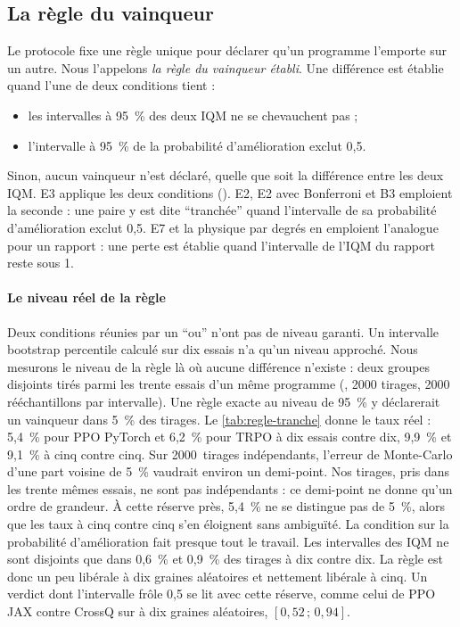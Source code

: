 \subsection{La règle du vainqueur}\label{sec:regle}
Le protocole fixe une règle unique pour déclarer qu'un programme l'emporte sur un autre. Nous l'appelons
\emph{la règle du vainqueur établi}. Une différence est établie quand l'une de deux conditions tient :
\begin{itemize}
  \item les intervalles à 95~\% des deux IQM ne se chevauchent pas ;
  \item l'intervalle à 95~\% de la probabilité d'amélioration exclut 0,5.
\end{itemize}
Sinon, aucun vainqueur n'est déclaré, quelle que soit la différence entre les deux IQM. E3 applique les deux conditions
(). E2, E2 avec Bonferroni et B3 emploient la seconde : une paire y est dite \enquote{tranchée}
quand l'intervalle de sa probabilité d'amélioration exclut 0,5. E7 et la physique par degrés en emploient
l'analogue pour un rapport : une perte est établie quand l'intervalle de l'IQM du rapport reste sous 1.

\paragraph{Le niveau réel de la règle}
Deux conditions réunies par un \enquote{ou} n'ont pas de niveau garanti. Un intervalle bootstrap percentile
calculé sur dix essais n'a qu'un niveau approché. Nous mesurons le niveau de la règle là où aucune différence n'existe : deux groupes disjoints tirés parmi les trente essais d'un même
programme (, \num{2000} tirages, \num{2000} rééchantillons par
intervalle). Une règle exacte au niveau de 95~\% y déclarerait un vainqueur dans 5~\% des tirages. Le
\cref{tab:regle-tranche} donne le taux réel : 5,4~\% pour PPO PyTorch et 6,2~\% pour TRPO à dix essais contre
dix, 9,9~\% et 9,1~\% à cinq contre cinq. Sur \num{2000}~tirages indépendants, l'erreur de Monte-Carlo d'une part
voisine de 5~\% vaudrait environ un demi-point. Nos tirages, pris dans les trente mêmes essais, ne sont pas
indépendants : ce demi-point ne donne qu'un ordre de grandeur. À cette réserve près, 5,4~\% ne se distingue pas
de 5~\%, alors que les taux à cinq contre cinq s'en éloignent sans ambiguïté. La condition sur la
probabilité d'amélioration fait presque tout le travail. Les intervalles des IQM ne sont disjoints que dans
0,6~\% et 0,9~\% des tirages à dix contre dix. La règle est donc un peu libérale à dix graines aléatoires et
nettement libérale à cinq. Un verdict dont l'intervalle frôle 0,5 se lit avec cette réserve, comme celui de
PPO JAX contre CrossQ sur  à dix graines aléatoires, $[0{,}52\,;\,0{,}94]$.


